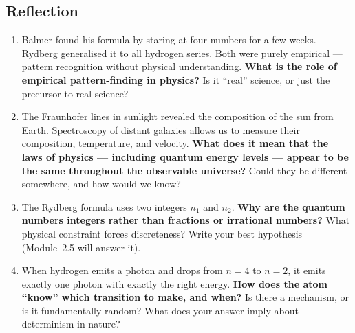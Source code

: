 \documentclass[12pt, a4paper]{book}
\begin{document}
\subsection*{Reflection}

\begin{reflectionbox}
\begin{enumerate}[label=\textbf{R\arabic*.}]
  \item Balmer found his formula by staring at four numbers
        for a few weeks.
        Rydberg generalised it to all hydrogen series.
        Both were purely empirical --- pattern recognition
        without physical understanding.
        \textbf{What is the role of empirical pattern-finding
        in physics?} Is it ``real'' science, or just
        the precursor to real science?

  \item The Fraunhofer lines in sunlight revealed the
        composition of the sun from Earth.
        Spectroscopy of distant galaxies allows us to measure
        their composition, temperature, and velocity.
        \textbf{What does it mean that the laws of physics ---
        including quantum energy levels --- appear to be the
        same throughout the observable universe?}
        Could they be different somewhere, and how would we know?

  \item The Rydberg formula uses two integers $n_1$ and $n_2$.
        \textbf{Why are the quantum numbers integers rather
        than fractions or irrational numbers?}
        What physical constraint forces discreteness?
        Write your best hypothesis (Module~2.5 will answer it).

  \item When hydrogen emits a photon and drops from $n=4$ to $n=2$,
        it emits exactly one photon with exactly the right energy.
        \textbf{How does the atom ``know'' which transition to make,
        and when?} Is there a mechanism, or is it fundamentally random?
        What does your answer imply about determinism in nature?
\end{enumerate}
\end{reflectionbox}
\end{document}
